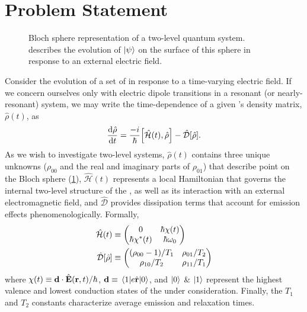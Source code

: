 \section{\label{section:problem statement}Problem Statement}

\begin{figure}
  \centering
  \caption{\label{fig:bloch sphere}Bloch sphere representation of a two-level quantum system.
     describes the evolution of $\ket{\psi}$ on the surface of this sphere in response to an external electric field.
  }
\end{figure}

Consider the evolution of a set of \qds{} in response to a time-varying electric field.
If we concern ourselves only with electric dipole transitions in a resonant (or nearly-resonant) system, we may write the time-dependence of a given \qd's density matrix, $\hat{\rho}(t)$, as
\begin{equation}
  \dv{\hat{\rho}}{t} = \frac{-i}{\hbar}\commutator{\hat{\mathcal{H}}(t)}{\hat{\rho}} - \hat{\mathcal{D}}\qty[\hat{\rho}].
  \label{eq:liouville}
\end{equation}
As we wish to investigate two-level systems, $\hat{\rho}(t)$ contains three unique unknowns ($\rho_{00}$ and the real and imaginary parts of $\rho_{01}$) that describe point on the Bloch sphere (\cref{fig:bloch sphere}), $\hat{\mathcal{H}}(t)$ represents a local Hamiltonian that governs the internal two-level structure of the \qd{}, as well as its interaction with an external electromagnetic field, and $\hat{\mathcal{D}}$ provides dissipation terms that account for emission effects phenomenologically.
Formally,
\begin{subequations}
  \begin{align}
    \hat{\mathcal{H}}(t) &\equiv \mqty(0 & \hbar \chi(t) \\ \hbar \chi^*(t) & \hbar \omega_0) \label{eq:hamiltonian}\\
    \hat{\mathcal{D}}\qty[\hat{\rho}] &\equiv \mqty( \qty(\rho_{00} - 1)/{T_1} & \rho_{01}/{T_2} \\ \rho_{10}/{T_2} & \rho_{11}/T_1 ) \label{eq:dissipator}
  \end{align}
  \label{eq:qd operators}
\end{subequations}
where $\chi(t) \equiv \vb{d} \cdot \hat{\vb{E}}(\vb{r}, t)/\hbar$, $\vb{d} \equiv \matrixel{1}{e \hat{\vb{r}}}{0}$, and $\ket{0}$ \& $\ket{1}$ represent the highest valence and lowest conduction states of the \qd{} under consideration.
Finally, the $T_1$ and $T_2$ constants characterize average emission and relaxation times.

